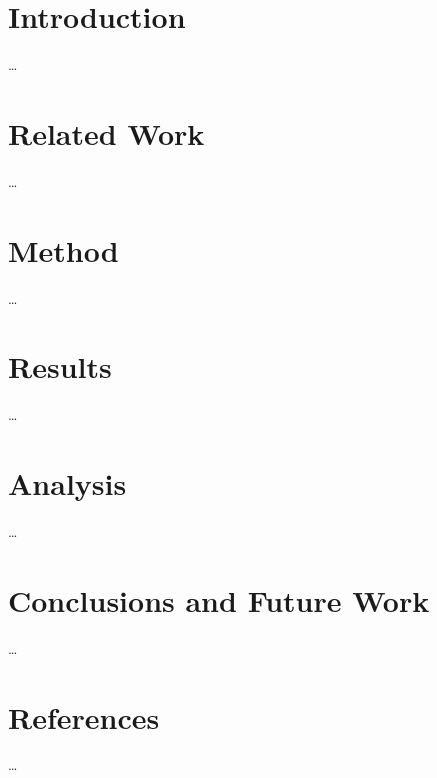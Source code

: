 \documentclass[oneside]{bthdiss} %
\begin{document}
\newcommand{\bthdissthesisno}{\textbf{DEPT}-\textbf{YEAR}-\textbf{NO}}
\newcommand{\bthdissthesistitle}{%
  \textbf{Centered Title Times Font}\\
  \vspace{0.25cm}\textbf{Size 24 Bold}} %
\newcommand{\bthdissthesissubtitle}{%
  \textbf{Centered Subtitle Times Font}\\
  \vspace{0.25cm}\textbf{Size 16 Bold}} %
\newcommand{\bthdissfirstname}{Firstname} %
\newcommand{\bthdisslastname}{Lastname} %
\newcommand{\bthdissdegree}{Master of Science in Computer Science}
\newcommand{\bthdissdept}{Dept. Computer Science \& Engineering}
\newcommand{\bthdissnumweeks}{\textbf{XX}}
\newcommand{\bthdissemail}{%
  \href{mailto:acroyy@student.bth.se}{acroyy@student.bth.se}}
\newcommand{\bthdissadvisoruni}{Prof. Firstname Lastname}
\newcommand{\bthdissadvisorext}{Dr. Firstname Lastname}
\newcommand{\bthdissadvisorextorg}{Corporation AB}




\pagestyle{plain}
\setcounter{page}{1}

\begingroup%
\let\cleardoublepage\clearpage%
\tableofcontents%
\endgroup%

\cleardoublepage%
\pagestyle{headings}

\chapter{Introduction}
\ldots

\chapter{Related Work}
\ldots

\chapter{Method}
\ldots

\chapter{Results}
\ldots

\chapter{Analysis}
\ldots

\chapter{Conclusions and Future Work}
\ldots

\chapter*{References}
\ldots
\end{document}
